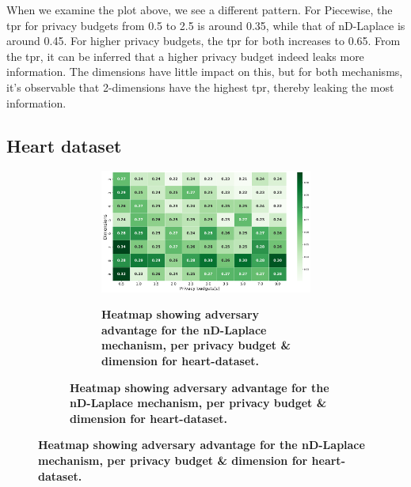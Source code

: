{\begin{figure}[H]
\begin{subfigure}[b]{0.75\textwidth}
\begin{subfigure}[c]{1\textwidth}
            \label{fig:privacy_tpr_seeds-dataset_adversial_advantage_piecewise}
        \end{subfigure}
    \end{subfigure}
\end{figure}
When we examine the plot above, we see a different pattern. For Piecewise, the \gls{tpr} for privacy budgets from 0.5 to 2.5 is around 0.35, while that of nD-Laplace is around 0.45.
For higher privacy budgets, the \gls{tpr} for both increases to 0.65.
From the \gls{tpr}, it can be inferred that a higher privacy budget indeed leaks more information.
The dimensions have little impact on this, but for both mechanisms, it's observable that 2-dimensions have the highest \gls{tpr}, thereby leaking the most information.

\newpage
\subsection{Heart dataset}
\begin{figure}[H]
  \centering
  \begin{subfigure}[b]{0.75\textwidth}
    \begin{subfigure}[c]{1\textwidth}
      \caption{\textbf{Heatmap showing adversary advantage for the nD-Laplace mechanism, per privacy budget \& dimension for heart-dataset.}}
      \includegraphics[width=1\textwidth]{Results/nd-laplace/nd-Laplace/heart-dataset/shokri_mi_adv.png}
      \label{fig:privacy_heart-dataset_adversial_advantage_kd-laplace}
    \end{subfigure}
    \vfill %


\end{subfigure}
\end{figure}}
